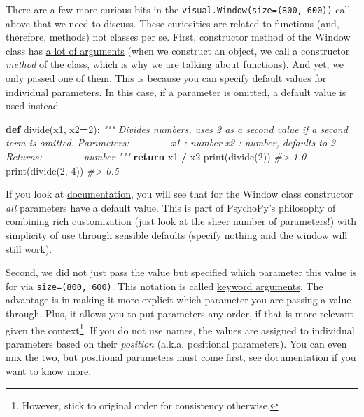 \documentclass[
]{book}
\newenvironment{Shaded}{\begin{snugshade}}{\end{snugshade}}
\newcommand{\BuiltInTok}[1]{#1}
\newcommand{\CommentTok}[1]{\textcolor[rgb]{0.56,0.35,0.01}{\textit{#1}}}
\newcommand{\ControlFlowTok}[1]{\textcolor[rgb]{0.13,0.29,0.53}{\textbf{#1}}}
\newcommand{\DecValTok}[1]{\textcolor[rgb]{0.00,0.00,0.81}{#1}}
\newcommand{\KeywordTok}[1]{\textcolor[rgb]{0.13,0.29,0.53}{\textbf{#1}}}
\newcommand{\NormalTok}[1]{#1}
\newcommand{\OperatorTok}[1]{\textcolor[rgb]{0.81,0.36,0.00}{\textbf{#1}}}
\begin{document}
There are a few more curious bits in the \texttt{visual.Window(size=(800,\ 600))} call above that we need to discuss. These curiosities are related to functions (and, therefore, methods) not classes per se. First, constructor method of the Window class has \href{https://psychopy.org/api/visual/window.html\#psychopy.visual.Window}{a lot of arguments} (when we construct an object, we call a constructor \emph{method} of the class, which is why we are talking about functions). And yet, we only passed one of them. This is because you can specify \href{https://docs.python.org/3/tutorial/controlflow.html\#default-argument-values}{default values} for individual parameters. In this case, if a parameter is omitted, a default value is used instead

\begin{Shaded}
\begin{Highlighting}[]
\KeywordTok{def}\NormalTok{ divide(x1, x2}\OperatorTok{=}\DecValTok{2}\NormalTok{):}
  \CommentTok{"""}
\CommentTok{  Divides numbers, uses 2 as a second value if a second term is omitted.}
\CommentTok{  }
\CommentTok{  Parameters:}
\CommentTok{  {-}{-}{-}{-}{-}{-}{-}{-}{-}{-}}
\CommentTok{  x1 : number}
\CommentTok{  x2 : number, defaults to 2}
\CommentTok{  }
\CommentTok{  Returns:}
\CommentTok{  {-}{-}{-}{-}{-}{-}{-}{-}{-}{-}}
\CommentTok{  number}
\CommentTok{  """}
  \ControlFlowTok{return}\NormalTok{ x1 }\OperatorTok{/}\NormalTok{ x2}
\BuiltInTok{print}\NormalTok{(divide(}\DecValTok{2}\NormalTok{))}
\CommentTok{\#\textgreater{} 1.0}
\BuiltInTok{print}\NormalTok{(divide(}\DecValTok{2}\NormalTok{, }\DecValTok{4}\NormalTok{))}
\CommentTok{\#\textgreater{} 0.5}
\end{Highlighting}
\end{Shaded}

If you look at \href{https://psychopy.org/api/visual/window.html\#psychopy.visual.Window}{documentation}, you will see that for the Window class constructor \emph{all} parameters have a default value. This is part of PsychoPy's philosophy of combining rich customization (just look at the sheer number of parameters!) with simplicity of use through sensible defaults (specify nothing and the window will still work).

Second, we did not just pass the value but specified which parameter this value is for via \texttt{size=(800,\ 600)}. This notation is called \href{https://docs.python.org/3/tutorial/controlflow.html\#keyword-arguments}{keyword arguments}. The advantage is in making it more explicit which parameter you are passing a value through. Plus, it allows you to put parameters any order, if that is more relevant given the context\footnote{However, stick to original order for consistency otherwise.}. If you do not use names, the values are assigned to individual parameters based on their \emph{position} (a.k.a. positional parameters). You can even mix the two, but positional parameters must come first, see \href{https://docs.python.org/3/tutorial/controlflow.html\#more-on-defining-functions}{documentation} if you want to know more.
\end{document}
